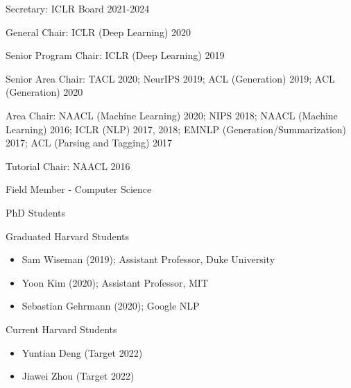 \documentclass[10pt]{article}
\begin{document}



\medskip


\bigskip

\ind Secretary:
\ind ICLR Board 2021-2024

\ind General  Chair:
\ind ICLR (Deep Learning) 2020

\ind Senior Program Chair:
\ind ICLR (Deep Learning) 2019

\ind Senior Area Chair:
\ind TACL 2020; NeurIPS 2019; ACL (Generation) 2019; ACL (Generation) 2020

\ind Area Chair:
\ind NAACL (Machine Learning) 2020; NIPS 2018; NAACL (Machine Learning) 2016; ICLR (NLP) 2017, 2018; EMNLP (Generation/Summarization) 2017; ACL (Parsing and Tagging) 2017

\ind Tutorial Chair: NAACL 2016

\bigskip

\medskip

\ind Field Member - Computer Science

\ind PhD Students


\ind Graduated Harvard Students

\begin{itemize}
\item Sam Wiseman (2019); Assistant Professor, Duke University
\item Yoon Kim (2020); Assistant Professor, MIT
\item Sebastian Gehrmann (2020); Google NLP
\end{itemize}

\ind Current Harvard Students

\begin{itemize}
\item Yuntian Deng (Target 2022)
\item Jiawei Zhou (Target 2022)
\end{itemize}
\end{document}
